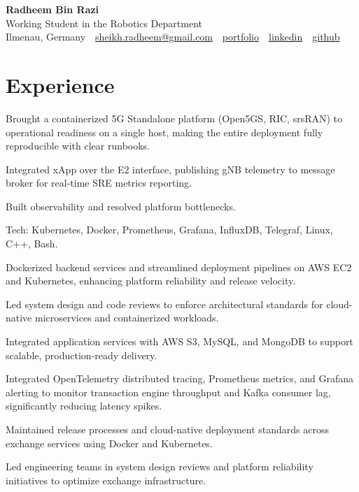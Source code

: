 \documentclass[10pt,a4paper]{resume}
\makeatletter
\newcommand{\Portfolio}{https://radheem.github.io/my-cv}
\newcommand{\PortfolioText}{portfolio}
\newcommand{\GitHub}{https://github.com/radheem}
\newcommand{\LinkedIn}{https://www.linkedin.com/in/radheem-razi}
\newcommand{\Email}{sheikh.radheem@gmail.com}
\makeatother
\begin{document}
\begin{center}
  {\huge\bfseries Radheem Bin Razi}\\[3pt]
  {\large Working Student in the Robotics Department}\\[6pt]
  \small
  Ilmenau, Germany \,\textbar\,
  \href{mailto:\Email}{\Email} \,\textbar\,
  \href{\Portfolio}{\PortfolioText} \,\textbar\,
  \href{\LinkedIn}{linkedin} \,\textbar\,
  \href{\GitHub}{github}
\end{center}
\vspace{2pt}

\section{Experience}

\bullets
  \item Brought a containerized 5G Standalone platform (Open5GS, RIC, srsRAN) to operational readiness on a single host, making the entire deployment fully reproducible with clear runbooks.
  \item Integrated xApp over the E2 interface, publishing gNB telemetry to message broker for real-time SRE metrics reporting.
  \item Built observability and resolved platform bottlenecks.
  \item Tech: Kubernetes, Docker, Prometheus, Grafana, InfluxDB, Telegraf, Linux, C++, Bash.
\bulletsend
\vspace{1.5pt}
\bullets
  \item Dockerized backend services and streamlined deployment pipelines on AWS EC2 and Kubernetes, enhancing platform reliability and release velocity.
  \item Led system design and code reviews to enforce architectural standards for cloud-native microservices and containerized workloads.
  \item Integrated application services with AWS S3, MySQL, and MongoDB to support scalable, production-ready delivery.
\bulletsend
\vspace{1.5pt}
\bullets
  \item Integrated OpenTelemetry distributed tracing, Prometheus metrics, and Grafana alerting to monitor transaction engine throughput and Kafka consumer lag, significantly reducing latency spikes.
  \item Maintained release processes and cloud-native deployment standards across exchange services using Docker and Kubernetes.
  \item Led engineering teams in system design reviews and platform reliability initiatives to optimize exchange infrastructure.
\bulletsend
\vspace{1.5pt}
\end{document}
